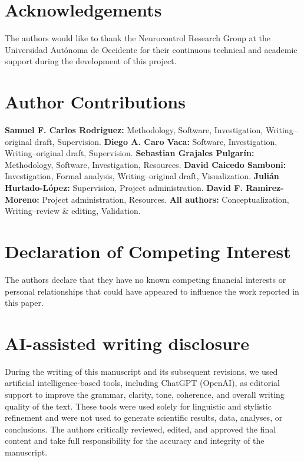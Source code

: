 \documentclass[preprint,12pt]{elsarticle}
\begin{document}
\section*{Acknowledgements}

The authors would like to thank the Neurocontrol Research Group at the Universidad Autónoma de Occidente for their continuous technical and academic support during the development of this project.

\section*{Author Contributions}

\textbf{Samuel F. Carlos Rodriguez:} Methodology, Software, Investigation, Writing--original draft, Supervision.
\textbf{Diego A. Caro Vaca:} Software, Investigation, Writing--original draft, Supervision.
\textbf{Sebastian Grajales Pulgarín:} Methodology, Software, Investigation, Resources.
\textbf{David Caicedo Samboni:} Investigation, Formal analysis, Writing--original draft, Visualization.
\textbf{Julián Hurtado-López:} Supervision, Project administration.
\textbf{David F. Ramirez-Moreno:} Project administration, Resources.
\textbf{All authors:} Conceptualization, Writing--review \& editing, Validation.

\section*{Declaration of Competing Interest}

The authors declare that they have no known competing financial interests or personal relationships that could have appeared to influence the work reported in this paper.

\section*{AI-assisted writing disclosure}

During the writing of this manuscript and its subsequent revisions, we used artificial intelligence-based tools, including ChatGPT (OpenAI), as editorial support to improve the grammar, clarity, tone, coherence, and overall writing quality of the text. These tools were used solely for linguistic and stylistic refinement and were not used to generate scientific results, data, analyses, or conclusions. The authors critically reviewed, edited, and approved the final content and take full responsibility for the accuracy and integrity of the manuscript.
\end{document}
